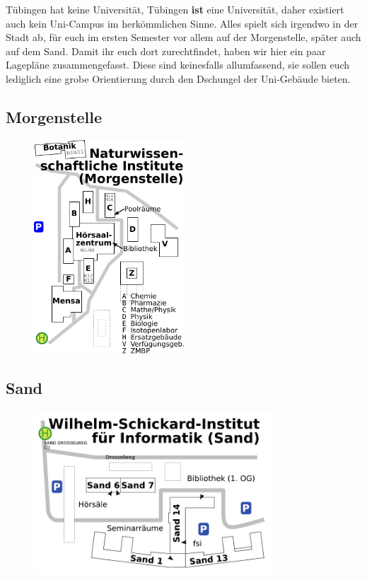 Tübingen hat keine Universität, Tübingen \textbf{ist} eine Universität, daher existiert auch kein Uni-Campus im herkömmlichen Sinne. Alles spielt sich irgendwo in der Stadt ab, für euch im ersten Semester vor allem auf der Morgenstelle, später auch auf dem Sand. Damit ihr euch dort zurechtfindet, haben wir hier ein paar Lagepläne zusammengefasst. Diese sind keinesfalls allumfassend, sie sollen euch lediglich eine grobe Orientierung durch den Dschungel der Uni-Gebäude bieten.
\subsection*{Morgenstelle}
\begin{figure}[ht!]
\centering
\includegraphics[width=0.5\textwidth]{info/anhang/lageplaene/uebersicht_morgenstelle.pdf}
\end{figure}
\newpage
\subsection*{Sand}
\begin{figure}[ht!]
	\centering
	\includegraphics[width=0.8\textwidth]{info/anhang/lageplaene/uebersicht_sand.pdf}
\end{figure}
